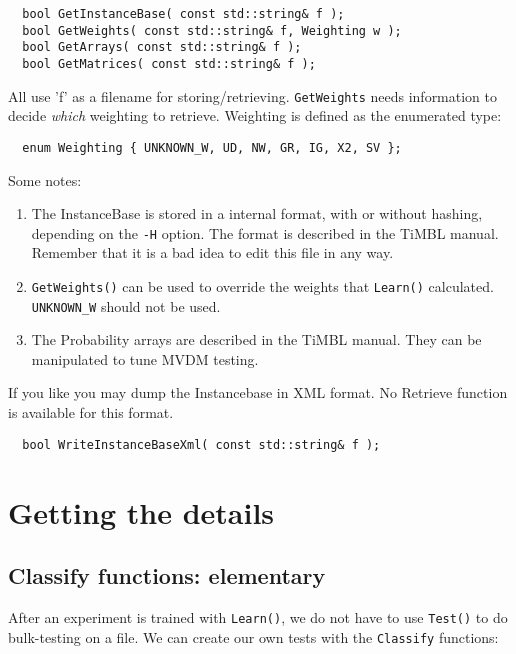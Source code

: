 \documentclass{report}
\begin{document}
\begin{footnotesize}
\begin{verbatim}
  bool GetInstanceBase( const std::string& f );
  bool GetWeights( const std::string& f, Weighting w );
  bool GetArrays( const std::string& f );
  bool GetMatrices( const std::string& f );
\end{verbatim}
\end{footnotesize}

All use 'f' as a filename for storing/retrieving. {\tt GetWeights} needs
information to decide {\em which}\/ weighting to retrieve.
Weighting is defined as the enumerated type:

\begin{footnotesize}
\begin{verbatim}
  enum Weighting { UNKNOWN_W, UD, NW, GR, IG, X2, SV };
\end{verbatim}
\end{footnotesize}

Some notes:

\begin{enumerate}
\item The InstanceBase is stored in a internal format, with or without
hashing, depending on the {\tt -H} option. The format is described in the
TiMBL manual. Remember that it is a bad idea to edit this file in any way.
\item {\tt GetWeights()} can be used to override the weights that
{\tt Learn()} calculated. {\tt UNKNOWN\_W} should not be used.
\item The Probability arrays are described in the TiMBL manual. They can be
manipulated to tune MVDM testing.
\end{enumerate}

If you like you may dump the Instancebase in XML format. No Retrieve
function is available for this format.

\begin{footnotesize}
\begin{verbatim}
  bool WriteInstanceBaseXml( const std::string& f );
\end{verbatim}
\end{footnotesize}

\chapter{Getting the details}

\section{Classify functions: elementary}
After an experiment is trained with {\tt Learn()}, we do not have to use
{\tt Test()} to do bulk-testing on a file.
We can create our own tests with the {\tt Classify} functions:
\end{document}
